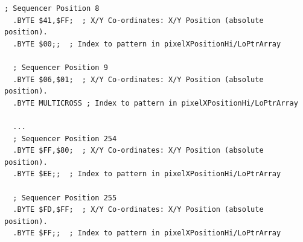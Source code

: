 \begin{lstlisting}[basicstyle=\ttfamily\scriptsize,caption=Sequencer definition in \icode{sequencer\_data.asm}.,escapechar=\%]
  ; Sequencer Position 8
  .BYTE $41,$FF;  ; X/Y Co-ordinates: X/Y Position (absolute position).   
  .BYTE $00;;  ; Index to pattern in pixelXPositionHi/LoPtrArray   

  ; Sequencer Position 9
  .BYTE $06,$01;  ; X/Y Co-ordinates: X/Y Position (absolute position).   
  .BYTE MULTICROSS ; Index to pattern in pixelXPositionHi/LoPtrArray   

  ...
  ; Sequencer Position 254
  .BYTE $FF,$80;  ; X/Y Co-ordinates: X/Y Position (absolute position).   
  .BYTE $EE;;  ; Index to pattern in pixelXPositionHi/LoPtrArray   

  ; Sequencer Position 255
  .BYTE $FD,$FF;  ; X/Y Co-ordinates: X/Y Position (absolute position).   
  .BYTE $FF;;  ; Index to pattern in pixelXPositionHi/LoPtrArray   
    
\end{lstlisting}

